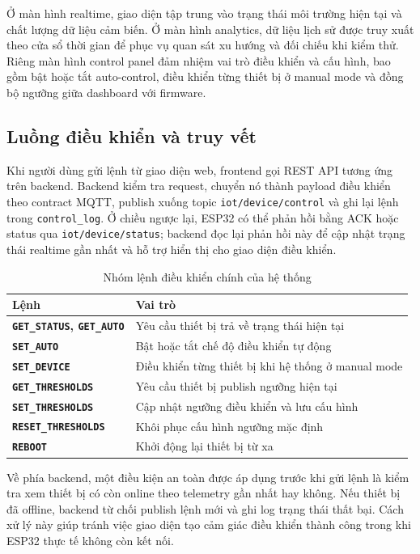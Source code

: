 Ở màn hình realtime, giao diện tập trung vào trạng thái môi trường hiện tại và chất
lượng dữ liệu cảm biến. Ở màn hình analytics, dữ liệu lịch sử được truy xuất theo cửa sổ
thời gian để phục vụ quan sát xu hướng và đối chiếu khi kiểm thử. Riêng màn hình control
panel đảm nhiệm vai trò điều khiển và cấu hình, bao gồm bật hoặc tắt auto-control, điều
khiển từng thiết bị ở manual mode và đồng bộ ngưỡng giữa dashboard với firmware.

\subsection{Luồng điều khiển và truy vết}

Khi người dùng gửi lệnh từ giao diện web, frontend gọi REST API tương ứng trên backend.
Backend kiểm tra request, chuyển nó thành payload điều khiển theo contract MQTT, publish
xuống topic \texttt{iot/device/control} và ghi lại lệnh trong \texttt{control\_log}. Ở
chiều ngược lại, ESP32 có thể phản hồi bằng ACK hoặc status qua
\texttt{iot/device/status}; backend đọc lại phản hồi này để cập nhật trạng thái realtime
gần nhất và hỗ trợ hiển thị cho giao diện điều khiển.

\begin{table}[H]
    \centering
    \caption{Nhóm lệnh điều khiển chính của hệ thống}
    \begin{tabularx}{\textwidth}{>{\bfseries}l X}
        \toprule
        Lệnh & Vai trò \\
        \midrule
        \texttt{GET\_STATUS}, \texttt{GET\_AUTO} & Yêu cầu thiết bị trả về trạng thái hiện tại \\
        \texttt{SET\_AUTO} & Bật hoặc tắt chế độ điều khiển tự động \\
        \texttt{SET\_DEVICE} & Điều khiển từng thiết bị khi hệ thống ở manual mode \\
        \texttt{GET\_THRESHOLDS} & Yêu cầu thiết bị publish ngưỡng hiện tại \\
        \texttt{SET\_THRESHOLDS} & Cập nhật ngưỡng điều khiển và lưu cấu hình \\
        \texttt{RESET\_THRESHOLDS} & Khôi phục cấu hình ngưỡng mặc định \\
        \texttt{REBOOT} & Khởi động lại thiết bị từ xa \\
        \bottomrule
    \end{tabularx}
\end{table}

Về phía backend, một điều kiện an toàn được áp dụng trước khi gửi lệnh là kiểm tra xem
thiết bị có còn online theo telemetry gần nhất hay không. Nếu thiết bị đã offline,
backend từ chối publish lệnh mới và ghi log trạng thái thất bại. Cách xử lý này giúp
tránh việc giao diện tạo cảm giác điều khiển thành công trong khi ESP32 thực tế không còn
kết nối.

